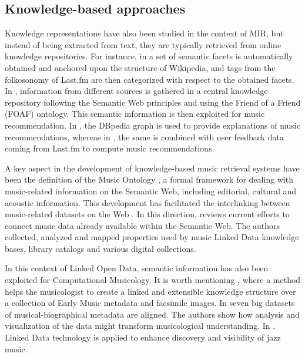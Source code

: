 \subsection{Knowledge-based approaches}
\label{sec:SOA:mir:semantics}

Knowledge representations have also been studied in the context of MIR, but instead of being extracted from text, they are typically retrieved from online knowledge repositories. For instance, in \cite{sordo2013inferring} a set of semantic facets is automatically obtained and anchored upon the structure of Wikipedia, and tags from the folkosonomy of Last.fm are then categorized with respect to the obtained facets. In \cite{Celma:ISWC06}, information from different sources is gathered in a central knowledge repository following the Semantic Web principles and using the Friend of a Friend (FOAF) ontology. This semantic information is then exploited for music recommendation. In \cite{dbrec1}, the DBpedia graph is used to provide explanations of music recommendations, whereas in \cite{Ostuni2013}, the same is combined with user feedback data coming from Last.fm to compute music recommendations.

A key aspect in the development of knowledge-based music retrieval systems have been the definition of the Music Ontology \citep{raimond2007music}, a formal framework for dealing with music-related information on the Semantic Web, including editorial, cultural and acoustic information. This development has facilitated the interlinking between music-related datasets on the Web \citep{raimond2008automatic}. In this direction, \cite{Gracy2013} reviews current efforts to connect music data already available within the Semantic Web. The authors collected, analyzed and mapped properties used by music Linked Data knowledge bases, library catalogs and various digital collections.

In this context of Linked Open Data, semantic information has also been exploited for Computational Musicology. It is worth mentioning \cite{Crawford}, where a method helps the musicologist to create a linked and extensible knowledge structure over a collection of Early Music metadata and facsimile images.  
In \cite{Rose2014} seven big datasets of musical-biographical metadata are aligned. The authors show how analysis and visualization of the data might transform musicological understanding. In \cite{Pattuelli2013}, Linked Data technology is applied to enhance discovery and visibility of jazz music.


